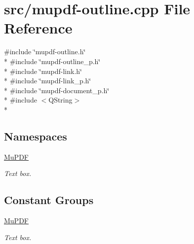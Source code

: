 \hypertarget{mupdf-outline_8cpp}{\section{src/mupdf-\/outline.cpp File Reference}
\label{mupdf-outline_8cpp}
}
{\ttfamily \#include \char`\"{}mupdf-\/outline.\-h\char`\"{}}\\*
{\ttfamily \#include \char`\"{}mupdf-\/outline\-\_\-p.\-h\char`\"{}}\\*
{\ttfamily \#include \char`\"{}mupdf-\/link.\-h\char`\"{}}\\*
{\ttfamily \#include \char`\"{}mupdf-\/link\-\_\-p.\-h\char`\"{}}\\*
{\ttfamily \#include \char`\"{}mupdf-\/document\-\_\-p.\-h\char`\"{}}\\*
{\ttfamily \#include $<$Q\-String$>$}\\*
\subsection*{Namespaces}
\begin{DoxyCompactItemize}
\item 
\hyperlink{namespace_mu_p_d_f}{Mu\-P\-D\-F}
\begin{DoxyCompactList}\small\item\em Text box. \end{DoxyCompactList}\end{DoxyCompactItemize}
\subsection*{Constant Groups}
\begin{DoxyCompactItemize}
\item 
\hyperlink{namespace_mu_p_d_f}{Mu\-P\-D\-F}
\begin{DoxyCompactList}\small\item\em Text box. \end{DoxyCompactList}\end{DoxyCompactItemize}
